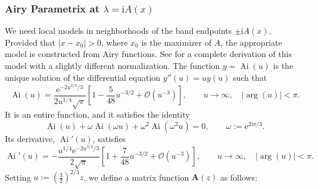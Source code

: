 \documentclass[12pt]{amsart}
\numberwithin{equation}{section}
\newcommand{\ee}{\mathrm{e}}
\newcommand{\ii}{\mathrm{i}}
\newcommand{\SP}{\lambda}
\newcommand{\bigo}[1]{ \mathcal{O}\! \left( #1 \right) }
\DeclareMathOperator{\Ai}{ {Ai} }
\begin{document}
\subsubsection{Airy Parametrix at $\SP = \ii A(x)$}
We need local models in neighborhoods of the band endpoints $\pm\ii A(x)$. 
Provided that $|x -x_0|> 0$, where $x_0$ is the maximizer of $A$, the appropriate model is constructed from Airy functions.  See \cite[Appendix B]{BothnerM19} for a complete derivation of this model with a slightly different normalization.
The function $y = \Ai(u)$ is the unique solution of the differential equation $y''(u) = u y(u)$ such that 
\begin{equation}
	\Ai(u) = \frac{ \ee^{-2u^{3/2}/3}}{2u^{1/4}\sqrt{\pi}} \left[ 1- \frac{5}{48} u^{-3/2} + \bigo{u^{-3}} \right],  \qquad u \to \infty, \quad | \arg(u) | < \pi.
	\label{eq:Airy-asymp}
\end{equation}
It is an entire function, and it satisfies the identity
\begin{equation}
	\Ai(u) + \omega \Ai(\omega u) + \omega^2 \Ai (\omega^2 u) = 0, \qquad \omega := \ee^{2\ii \pi/3}.
	\label{eq:Airy-connection}
\end{equation}
Its derivative, $\Ai'(u)$, satisfies
\begin{equation}
	\Ai'(u) = - \frac{ u^{1/4} \ee^{-2u^{3/2}/3}}{2\sqrt{\pi}} \left[ 1 + \frac{7}{48} u^{-3/2} + \bigo{u^{-3}} \right], \qquad u \to \infty, \quad | \arg(u) | < \pi.
	\label{eq:Airy-prime-asymp}
\end{equation}
Setting $u:= \left(\frac{3}{2}\right)^{2/3} z$, we define a matrix function $\mathbf{A}(z)$ as follows:
\end{document}
